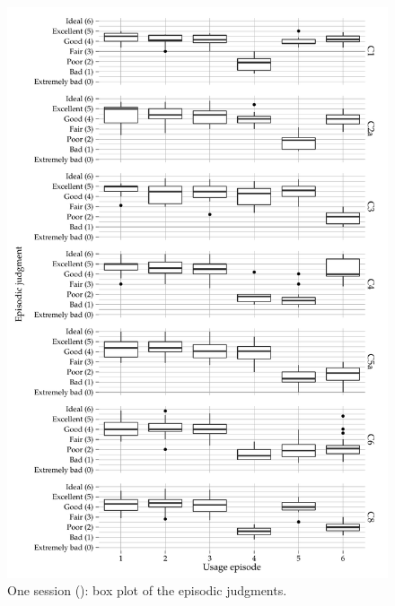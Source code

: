 \begin{figure}[H]
	\centering
\begin{knitrout}
\color{fgcolor}
\includegraphics[width=\maxwidth]{figure/plotE2a-1} 

\end{knitrout}
	\caption[One session (\EIIa{}): box plot of the episodic judgments]{One session (\EIIa{}): box plot of the episodic judgments.}	
\end{figure}

